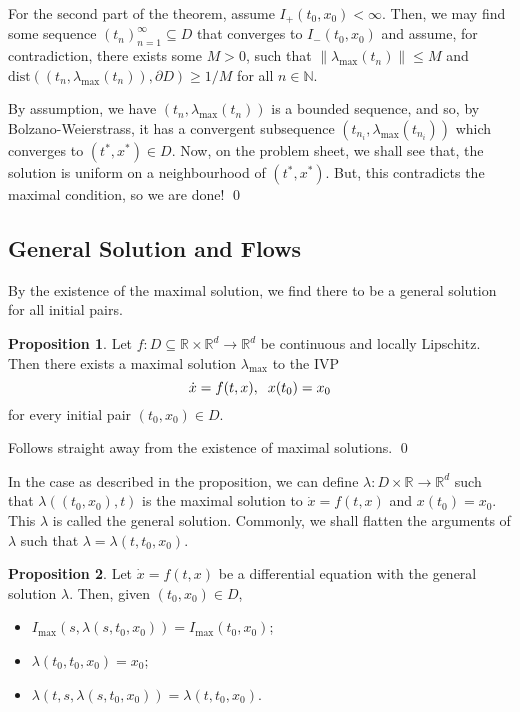 \documentclass[
]{article}
\theoremstyle{definition}
\newtheorem{prop}{Proposition}
\theoremstyle{definition}
\begin{document}
For the second part of the theorem, assume \(I_+(t_0, x_0) < \infty\).
Then, we may find some sequence \((t_n)_{n = 1}^\infty\subseteq D\) that
converges to \(I_-(t_0, x_0)\) and assume, for contradiction, there
exists some \(M > 0\), such that \(\|\lambda_{\max}(t_n)\| \le M\) and
\(\text{dist}((t_n, \lambda_{\max}(t_n)),  \partial D) \ge 1 / M\) for
all \(n \in \mathbb{N}\).

By assumption, we have \((t_n, \lambda_{\max}(t_n))\) is a bounded
sequence, and so, by Bolzano-Weierstrass, it has a convergent
subsequence \((t_{n_i}, \lambda_{\max}(t_{n_i}))\) which converges to
\((t^*, x^*) \in D\). Now, on the problem sheet, we shall see that, the
solution is uniform on a neighbourhood of \((t^*, x^*)\). But, this
contradicts the maximal condition, so we are done! \qed

\hypertarget{general-solution-and-flows}{%
\subsection{General Solution and
Flows}\label{general-solution-and-flows}}

By the existence of the maximal solution, we find there to be a general
solution for all initial pairs.

\begin{prop}
  Let \(f : D \subseteq \mathbb{R} \times \mathbb{R}^d \to \mathbb{R}^d\) be 
  continuous and locally Lipschitz. Then there exists a maximal solution \(\lambda_{\max}\) 
  to the IVP
  \[\dot x = f(t, x), \hspace{2mm} x(t_0) = x_0\]
  for every initial pair \((t_0, x_0) \in D\). 
\end{prop}
\proof

Follows straight away from the existence of maximal solutions. \qed

In the case as described in the proposition, we can define
\(\lambda : D \times \mathbb{R} \to \mathbb{R}^d\) such that
\(\lambda((t_0, x_0), t)\) is the maximal solution to
\(\dot x = f(t, x)\) and \(x(t_0) = x_0\). This \(\lambda\) is called
the general solution. Commonly, we shall flatten the arguments of
\(\lambda\) such that \(\lambda = \lambda(t, t_0, x_0)\).

\begin{prop}
  Let \(\dot x = f(t, x)\) be a differential equation with the general solution 
  \(\lambda\). Then, given \((t_0, x_0) \in D\),
  \begin{itemize}
    \item \(I_{\max}(s, \lambda(s, t_0, x_0)) = I_{\max}(t_0, x_0)\);
    \item \(\lambda(t_0, t_0, x_0) = x_0\);
    \item \(\lambda(t, s, \lambda(s, t_0, x_0)) = \lambda(t, t_0, x_0)\).
  \end{itemize}
\end{prop}
\proof
\end{document}
